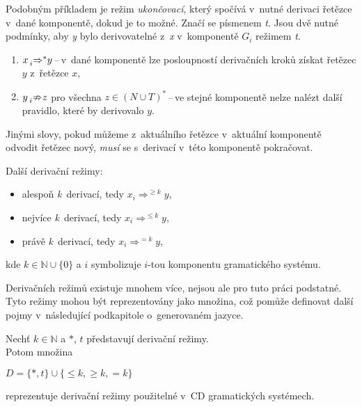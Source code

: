 Podobným příkladem je režim \emph{ukončovací}, který spočívá v~nutné derivaci řetězce v~dané komponentě, dokud je to možné. Značí se písmenem \emph{t}. Jsou dvě nutné podmínky, aby \emph{y} bylo derivovatelné z~\emph{x} v~komponentě $G_i$ režimem \emph{t}.
\begin{enumerate}
    \item $x \prescript{}{i}{\Rightarrow}^{*} y$\,--\,v~dané komponentě lze posloupností derivačních kroků získat řetězec $y$ z~řetězce $x$,
    \item $y \prescript{}{i}{\nRightarrow} z$ pro všechna $z \in (N \cup T)^{*}$\,--\,ve stejné komponentě nelze nalézt další pravidlo, které by derivovalo $y$.
\end{enumerate}
Jinými slovy, pokud můžeme z~aktuálního řetězce v~aktuální komponentě odvodit řetězec nový, \emph{musí} se s~derivací v~této komponentě pokračovat. 

Další derivační režimy:
\begin{itemize}
    \item alespoň \emph{k}~derivací, tedy $x_i \Rightarrow^{\geq k} y$,
    \item nejvíce \emph{k}~derivací, tedy $x_i \Rightarrow^{\leq k} y$,
    \item právě \emph{k}~derivací, tedy $x_i \Rightarrow^{=k} y$,
\end{itemize}
kde $k \in \mathbb{N} \cup \{0\}$ a $i$ symbolizuje $i$-tou komponentu gramatického systému.

Derivačních režimů existuje mnohem více, nejsou ale pro tuto práci podstatné.
Tyto režimy mohou být reprezentovány jako množina, což pomůže definovat další pojmy v~následující podkapitole o~generovaném jazyce.
\begin{definition}\label{def_der_rezimy}
    Nechť $k\in \mathbb{N}$ a $*$, $t$ představují derivační režimy. \\
    Potom množina
    \begin{center}
        $D = \{*, t\} \cup \{\leq k, \geq k, =k\}$ 
    \end{center}        
    reprezentuje derivační režimy použitelné v~CD gramatických systémech.
\end{definition}

